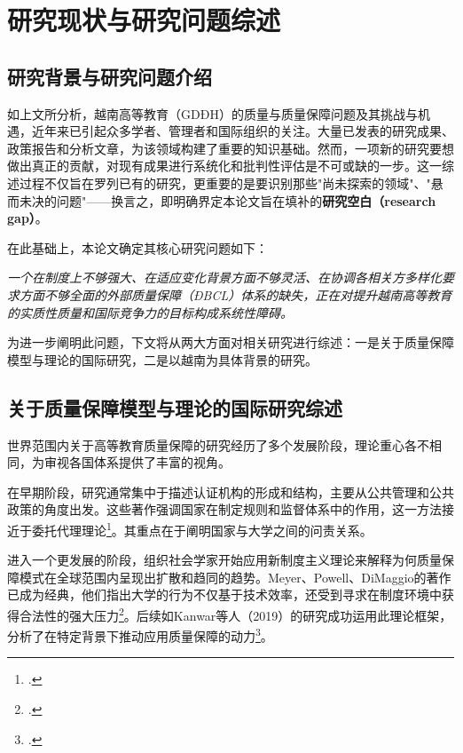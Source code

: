 

\section{研究现状与研究问题综述}
\label{sec:tong_quan_nghien_cuu}

\subsection{研究背景与研究问题介绍}

如上文所分析，越南高等教育（GDĐH）的质量与质量保障问题及其挑战与机遇，近年来已引起众多学者、管理者和国际组织的关注。大量已发表的研究成果、政策报告和分析文章，为该领域构建了重要的知识基础。然而，一项新的研究要想做出真正的贡献，对现有成果进行系统化和批判性评估是不可或缺的一步。这一综述过程不仅旨在罗列已有的研究，更重要的是要识别那些"尚未探索的领域"、"悬而未决的问题"——换言之，即明确界定本论文旨在填补的\textbf{研究空白（research gap）}。

在此基础上，本论文确定其核心研究问题如下：

\begin{center}
\textit{一个在制度上不够强大、在适应变化背景方面不够灵活、在协调各相关方多样化要求方面不够全面的外部质量保障（ĐBCL）体系的缺失，正在对提升越南高等教育的实质性质量和国际竞争力的目标构成系统性障碍。}
\end{center}

为进一步阐明此问题，下文将从两大方面对相关研究进行综述：一是关于质量保障模型与理论的国际研究，二是以越南为具体背景的研究。

\subsection{关于质量保障模型与理论的国际研究综述}

世界范围内关于高等教育质量保障的研究经历了多个发展阶段，理论重心各不相同，为审视各国体系提供了丰富的视角。

在早期阶段，研究通常集中于描述认证机构的形成和结构，主要从公共管理和公共政策的角度出发。这些著作强调国家在制定规则和监督体系中的作用，这一方法接近于委托代理理论\footcite{Kivisto2008}。其重点在于阐明国家与大学之间的问责关系。

进入一个更发展的阶段，组织社会学家开始应用新制度主义理论来解释为何质量保障模式在全球范围内呈现出扩散和趋同的趋势。Meyer、Powell、DiMaggio的著作已成为经典，他们指出大学的行为不仅基于技术效率，还受到寻求在制度环境中获得合法性的强大压力\footcite{MeyerPowell2020}。后续如Kanwar等人（2019）的研究成功运用此理论框架，分析了在特定背景下推动应用质量保障的动力\footcite{Kanwar2019}。

